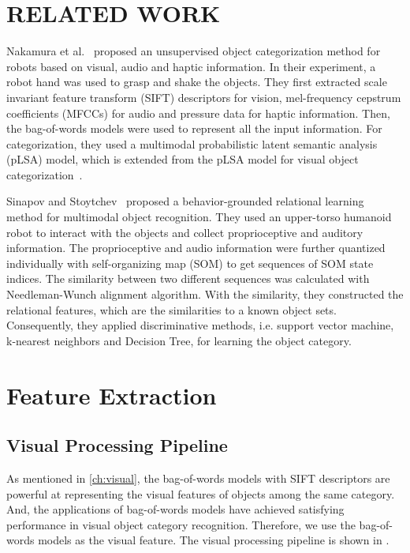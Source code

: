 \documentclass[letterpaper, 10 pt, conference]{ieeeconf}  %
\begin{document}
\section{RELATED WORK}

Nakamura et al.~\cite{nakamura_multimodal_2007} proposed an unsupervised object categorization method for robots based on visual, audio and haptic information. In their experiment, a robot hand was used to grasp and shake the objects. They first extracted scale invariant feature transform (SIFT) descriptors for vision, mel-frequency cepstrum coefficients (MFCCs) for audio and pressure data for haptic information. Then, the bag-of-words models were used to represent all the input information. For categorization, they used a multimodal probabilistic latent semantic analysis (pLSA) model, which is extended from the pLSA model for visual object categorization~\cite{sivic_discovering_2005}.

Sinapov and Stoytchev~\cite{sinapov_object_2011} proposed a behavior-grounded relational learning method for multimodal object recognition. They used an upper-torso humanoid robot to interact with the objects and collect proprioceptive and auditory information. The proprioceptive and audio information were further quantized individually with self-organizing map (SOM) to get sequences of SOM state indices. The similarity between two different sequences was calculated with Needleman-Wunch alignment algorithm. With the similarity, they constructed the relational features, which are the similarities to a known object sets. Consequently, they applied discriminative methods, i.e. support vector machine, k-nearest neighbors and Decision Tree, for learning the object category.

\section{Feature Extraction}
\subsection{Visual Processing Pipeline}
As mentioned in \cref{ch:visual}, the bag-of-words models with SIFT descriptors are powerful at representing the visual features of objects among the same category. And, the applications of bag-of-words models have achieved satisfying performance in visual object category recognition. Therefore, we use the bag-of-words models as the visual feature. The visual processing pipeline is shown in . 
\end{document}
